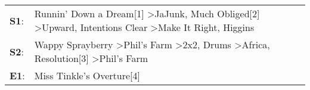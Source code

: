 \begin{supertabular}{p{0.03\textwidth}p{0.92\textwidth}}
 \textbf{S1}:  &  Runnin' Down a Dream[1]\textsuperscript{} \textgreater \enspace JaJunk\textsuperscript{}, \enspace Much Obliged[2]\textsuperscript{} \textgreater \enspace Upward\textsuperscript{}, \enspace Intentions Clear\textsuperscript{} \textgreater \enspace Make It Right\textsuperscript{}, \enspace Higgins\textsuperscript{}  \enspace  \\
 \textbf{S2}:  &           Wappy Sprayberry\textsuperscript{} \textgreater \enspace Phil's Farm\textsuperscript{} \textgreater \enspace 2x2\textsuperscript{}, \enspace Drums\textsuperscript{} \textgreater \enspace Africa\textsuperscript{}, \enspace Resolution[3]\textsuperscript{} \textgreater \enspace Phil's Farm\textsuperscript{}  \enspace  \\
 \textbf{E1}:  &                                                                                                                                                                                                                                                                                 Miss Tinkle's Overture[4]\textsuperscript{}  \enspace  \\
\end{supertabular}
